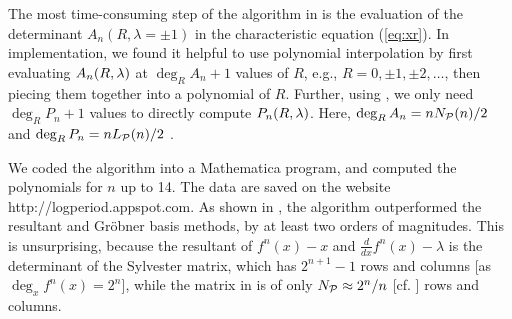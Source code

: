 \documentclass{ws-ijbc}
\begin{document}
The most time-consuming step of the algorithm in 
  is the evaluation of the determinant $A_n(R, \lambda = \pm1)$
  in the characteristic equation (\ref{eq:xr}).
%
In implementation,
we found it helpful to use polynomial interpolation
by first evaluating $A_n(R, \lambda)$ at $\deg_R A_n + 1$ values of $R$,
e.g., $R = 0, \pm1, \pm2,\ldots$, then piecing them together
into a polynomial of $R$.
%
Further, using , we only need $\deg_R P_n + 1$ values
  to directly compute $P_n(R, \lambda)$.
%
%
Here,
$\deg_R A_n = n N_\mathcal P(n)/2$
and $\deg_R P_n = n L_\mathcal P(n)/2$
  \cite{mira, stephenson1}.
%
%


We coded the algorithm into a Mathematica program,
  and computed the polynomials for $n$ up to 14.
The data are saved on the website http://logperiod.appspot.com.
%
%
%
%
%
As shown in , the algorithm
  outperformed the resultant \cite{burm} and
  Gr\"obner basis \cite{kk1} methods,
  by at least two orders of magnitudes.
%
This is unsurprising,
  because the resultant of $f^n(x)-x$ and $\frac{d}{dx}f^n(x)-\lambda$
  is the determinant of the Sylvester matrix, which has
  $2^{n+1}-1$ rows and columns
  [as $\deg_x f^n(x) = 2^n$],
  while the matrix in 
  is of only $N_\mathcal P \approx 2^n/n$ [cf. ] rows and columns.
\end{document}
